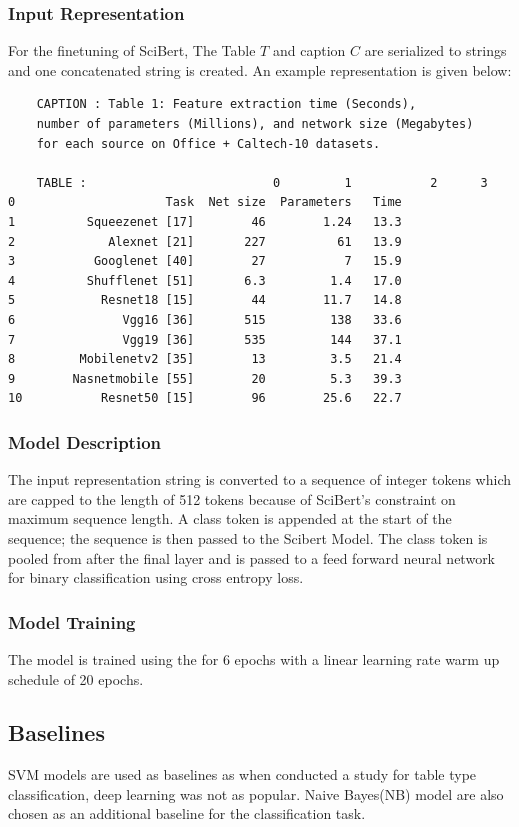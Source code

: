\subsubsection{Input Representation}
\label{table_classification:models:sb:input_rep}
For the finetuning of SciBert, The Table $T$ and caption $C$ are serialized to strings and one concatenated string is created. An example representation is given below: 
\begin{verbatim}
    CAPTION : Table 1: Feature extraction time (Seconds), 
    number of parameters (Millions), and network size (Megabytes) 
    for each source on Office + Caltech-10 datasets.

    TABLE :                          0         1           2      3
0                     Task  Net size  Parameters   Time
1          Squeezenet [17]        46        1.24   13.3
2             Alexnet [21]       227          61   13.9
3           Googlenet [40]        27           7   15.9
4          Shufflenet [51]       6.3         1.4   17.0
5            Resnet18 [15]        44        11.7   14.8
6               Vgg16 [36]       515         138   33.6
7               Vgg19 [36]       535         144   37.1
8         Mobilenetv2 [35]        13         3.5   21.4
9        Nasnetmobile [55]        20         5.3   39.3
10           Resnet50 [15]        96        25.6   22.7
\end{verbatim}

\subsubsection{Model Description}
The input representation string is converted to a sequence of integer tokens which are capped to the length of 512 tokens because of SciBert's constraint on maximum sequence length. A class token is appended at the start of the sequence; the sequence is then passed to the Scibert Model. The class token is pooled from after the final layer and is passed to a feed forward neural network for binary classification using cross entropy loss. 


\subsubsection{Model Training}
The model is trained using the for 6 epochs with a linear learning rate warm up schedule of 20 epochs.

\subsection{Baselines}
SVM models are used as baselines as when \cite{kim2012scientific} conducted a study for table type classification, deep learning was not as popular. Naive Bayes(NB) model are also chosen as an additional baseline for the classification task. 

